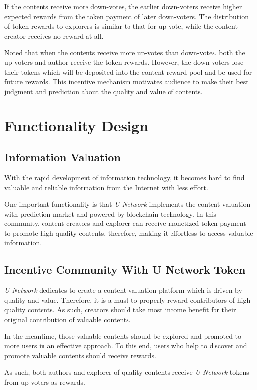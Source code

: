 If the contents receive more down-votes, the earlier down-voters receive higher expected rewards from the token payment of later down-voters. The distribution of token rewards to explorers is similar to that for up-vote, while the content creator receives no reward at all. 

Noted that when the contents receive more up-votes than down-votes, both the up-voters and author receive the token rewards. However, the down-voters lose their tokens which will be deposited into the content reward pool and be used for future rewards. This incentive mechanism motivates audience to make their best judgment and prediction about the quality and value of contents.




\section{Functionality Design}
\subsection{ Information Valuation}
With the rapid development of information technology, it becomes hard to find valuable and reliable information from the Internet with less effort.  

One important functionality is that \emph{U Network} implements the content-valuation with prediction market and powered by blockchain technology. 
In this community, content creators and explorer can receive monetized token payment to promote high-quality contents, therefore, making it effortless to access valuable information.

\subsection{Incentive Community With U Network Token}
\emph{U Network} dedicates to create a content-valuation platform which is driven by quality and value. Therefore, it is a must to properly reward contributors of high-quality contents. As such, creators should take most income benefit for their original contribution of valuable contents.

In the meantime, those valuable contents should be explored and promoted to more users in an effective approach. To this end, users who help to discover and promote valuable contents should receive rewards. 

As such, both authors and explorer of quality contents receive \emph{U Network} tokens from up-voters as rewards. 

